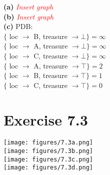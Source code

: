 \documentclass[12pt]{article}
\begin{document}
\textbf{(a)} \textcolor{red}{\emph{Insert graph}}\\
\textbf{(b)} \textcolor{red}{\emph{Insert graph}}\\
\textbf{(c)} PDB:\\
$\{$ loc $\to$ B, treasure $\to \bot \} = \infty$\\
$\{$ loc $\to$ A, treasure $\to \bot \} = \infty$\\
$\{$ loc $\to$ C, treasure $\to \bot \} = \infty$\\
$\{$ loc $\to$ A, treasure $\to \top \} = 2$\\
$\{$ loc $\to$ B, treasure $\to \top \} = 1$\\
$\{$ loc $\to$ C, treasure $\to \top \} = 0$\\

\section*{Exercise 7.3}

\texttt{[image: figures/7.3a.png]}\\
\texttt{[image: figures/7.3b.png]}\\
\texttt{[image: figures/7.3c.png]}\\
\texttt{[image: figures/7.3d.png]}\\
\end{document}
